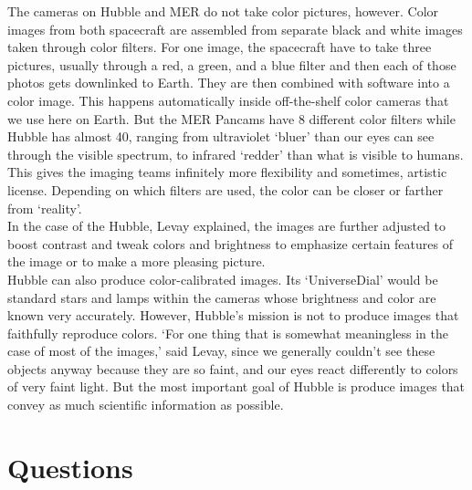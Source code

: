 \documentclass{literature}
\begin{document}
The cameras on Hubble and MER do not take color pictures, however. Color images from both spacecraft are assembled from separate black and white images taken through color filters. For one image, the spacecraft have to take three pictures, usually through a red, a green, and a blue filter and then each of those photos gets downlinked to Earth. They are then combined with software into a color image. This happens automatically inside off-the-shelf color cameras that we use here on Earth. But the MER Pancams have 8 different color filters while Hubble has almost 40, ranging from ultraviolet `bluer' than our eyes can see through the visible spectrum, to infrared `redder' than what is visible to humans. This gives the imaging teams infinitely more flexibility and sometimes, artistic license. Depending on which filters are used, the color can be closer or farther from `reality'. \\
In the case of the Hubble, Levay explained, the images are further adjusted to boost contrast and tweak colors and brightness to emphasize certain features of the image or to make a more pleasing picture. \\ 
Hubble can also produce color-calibrated images. Its `UniverseDial' would be standard stars and lamps within the cameras whose brightness and color are known very accurately. However, Hubble’s mission is not to produce images that faithfully reproduce colors. `For one thing that is somewhat meaningless in the case of most of the images,' said Levay, since we generally couldn’t see these objects anyway because they are so faint, and our eyes react differently to colors of very faint light. But the most important goal of Hubble is produce images that convey as much scientific information as possible.


\section{Questions}
\end{document}
